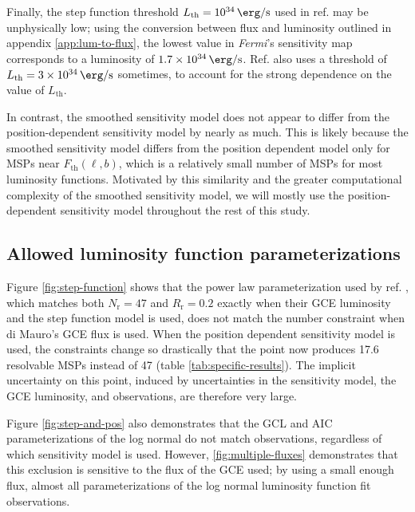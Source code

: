 \documentclass[a4paper,11pt]{article}
\newcommand{\comment}[1]{\emph{\color{red}{#1}}}
\begin{document}
Finally, the step function threshold $L_\text{th}=\SI{e34}{\erg\per\second}$ used in ref. \cite{Zhong:2019ycb} may be unphysically low; using the conversion between flux and luminosity outlined in appendix \ref{app:lum-to-flux}, the lowest value in \textit{Fermi}'s sensitivity map corresponds to a luminosity of $\SI{1.7e34}{\erg\per\second}$. Ref. \cite{Zhong:2019ycb} also uses a threshold of $L_\text{th}=\SI{3e34}{\erg\per\second}$ sometimes, to account for the strong dependence on the value of $L_\text{th}$. \comment{They don't actually say why they use 3e34. Is it fair to put words in their mouth? Also, maybe I should use 3e34. It wouldn't actually be that hard.}

In contrast, the smoothed sensitivity model does not appear to differ from the position-dependent sensitivity model by nearly as much. \comment{Except the power law, which may be a bug? I just checked; I don't think it's a bug.} This is likely because the smoothed sensitivity model differs from the position dependent model only for MSPs near $F_\text{th}(\ell, b)$, which is a relatively small number of MSPs for most luminosity functions. Motivated by this similarity and the greater computational complexity of the smoothed sensitivity model, we will mostly use the position-dependent sensitivity model throughout the rest of this study.


\subsection{Allowed luminosity function parameterizations}
Figure \ref{fig:step-function} shows that the power law parameterization used by ref. \cite{Zhong:2019ycb}, which matches both $N_\text{r}=47$ and $R_\text{r}=0.2$ exactly when their GCE luminosity and the step function model is used, does not match the number constraint when di Mauro's GCE flux is used. When the position dependent sensitivity model is used, the constraints change so drastically that the point now produces 17.6 resolvable MSPs instead of 47 (table \ref{tab:specific-results}). The implicit uncertainty on this point, induced by uncertainties in the sensitivity model, the GCE luminosity, and observations, are therefore very large.

Figure \ref{fig:step-and-pos} also demonstrates that the GCL and AIC parameterizations of the log normal do not match observations, regardless of which sensitivity model is used. However, \ref{fig:multiple-fluxes} demonstrates that this exclusion is sensitive to the flux of the GCE used; by using a small enough flux, almost all parameterizations of the log normal luminosity function fit observations.
\end{document}
